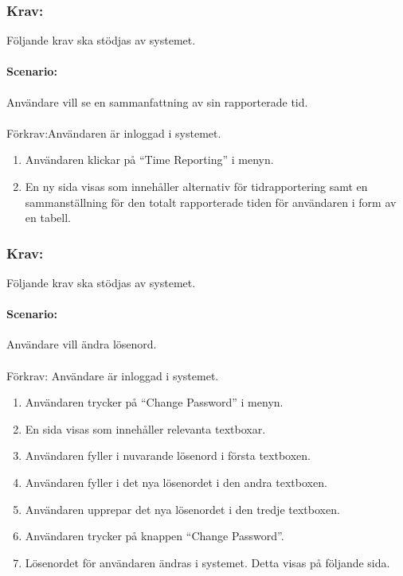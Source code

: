 \documentclass[paper=a4, fontsize=11pt,twoside]{article}
\begin{document}
 \subsubsection{Krav:}Följande krav ska stödjas av systemet.
 \paragraph{Scenario:}Användare vill se en sammanfattning av sin rapporterade tid.
 \paragraph{}
 Förkrav:Användaren är inloggad i systemet.
 \begin{enumerate}
\item  Användaren klickar på “Time Reporting” i menyn.
\item  En ny sida visas som innehåller alternativ för tidrapportering samt en sammanställning för den totalt rapporterade tiden för användaren i form av en tabell.

 \end{enumerate}
 \subsubsection{Krav:} Följande krav ska stödjas av systemet.
 \paragraph{Scenario:}Användare vill ändra lösenord.
 \paragraph{}
 Förkrav: Användare är inloggad i systemet.
 
 \begin{enumerate}
 \item	Användaren trycker på “Change Password” i menyn.
 \item	En sida visas som innehåller relevanta textboxar.
 \item	Användaren fyller i nuvarande lösenord i första textboxen.
 \item	Användaren fyller i det nya lösenordet i den andra textboxen.
 \item	Användaren upprepar det nya lösenordet i den tredje textboxen.
 \item	Användaren trycker på knappen “Change Password”.
 \item	Lösenordet för användaren ändras i systemet. Detta visas på följande sida.
 	
 \end{enumerate}
 
\end{document}

